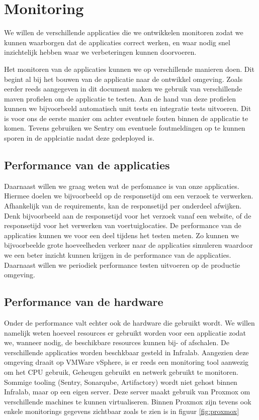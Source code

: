 \chapter{Monitoring}
We willen de verschillende applicaties die we ontwikkelen monitoren zodat we kunnen waarborgen dat de applicaties correct werken, en waar nodig snel inzichtelijk hebben waar we verbeteringen kunnen doorvoeren.

Het monitoren van de applicaties kunnen we op verschillende manieren doen. Dit begint al bij het bouwen van de applicatie naar de ontwikkel omgeving. Zoals eerder reeds aangegeven in dit document maken we gebruik van verschillende maven profielen om de applicatie te testen. Aan de hand van deze profielen kunnen we bijvoorbeeld automatisch unit tests en integratie tests uitvoeren. Dit is voor ons de eerste manier om achter eventuele fouten binnen de applicatie te komen.
Tevens gebruiken we Sentry om eventuele foutmeldingen op te kunnen sporen in de applciatie nadat deze gedeployed is.

\section{Performance van de applicaties}
Daarnaast willen we graag weten wat de perfomance is van onze applicaties. Hiermee doelen we bijvoorbeeld op de responsetijd om een verzoek te verwerken. Afhankelijk van de requirements, kan de responsetijd per onderdeel afwijken. Denk bijvoorbeeld aan de responsetijd voor het verzoek vanaf een website, of de responsetijd voor het verwerken van voertuiglocaties.
De performance van de applicaties kunnen we voor een deel tijdens het testen meten. Zo kunnen we bijvoorbeelde grote hoeveelheden verkeer naar de applicaties simuleren waardoor we een beter inzicht kunnen krijgen in de performance van de applicaties.
Daarnaast willen we periodiek performance testen uitvoeren op de productie omgeving.

\section{Performance van de hardware}
Onder de performance valt echter ook de hardware die gebruikt wordt. We willen namelijk weten hoeveel resources er gebruikt worden voor een applicatie zodat we, wanneer nodig, de beschikbare resources kunnen bij- of afschalen.
De verschillende applicaties worden beschkbaar gesteld in Infralab. Aangezien deze omgeving draait op VMWare vSphere, is er reeds een monitoring tool aanwezig om het CPU gebruik, Geheugen gebruikt en netwerk gebruikt te monitoren.
\newline
Sommige tooling (Sentry, Sonarqube, Artifactory) wordt niet gehost binnen Infralab, maar op een eigen server. Deze server maakt gebruik van Proxmox om verschillende machines te kunnen virtualiseren. Binnen Proxmox zijn tevens ook enkele monitorings gegevens zichtbaar zoals te zien is in figuur \ref{fig:proxmox}

